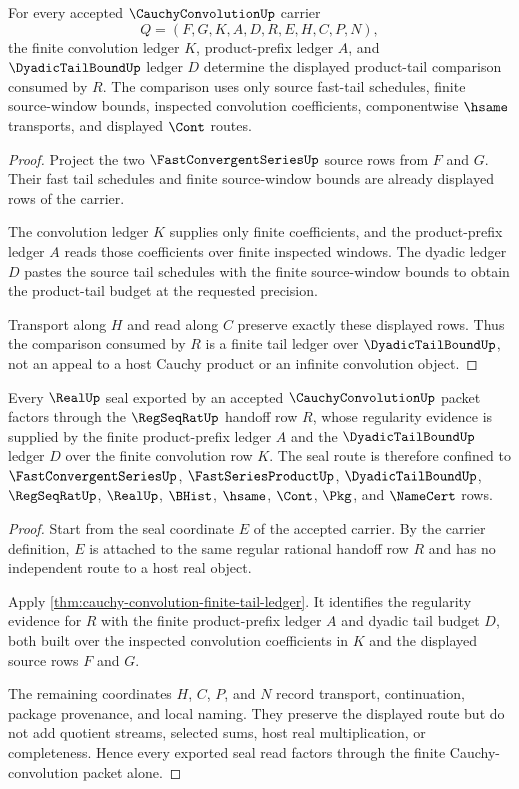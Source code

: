 \begin{theorem}
\label{thm:cauchy-convolution-finite-tail-ledger}
For every accepted $\CauchyConvolutionUp$ carrier
$$
Q=(F,G,K,A,D,R,E,H,C,P,N),
$$
the finite convolution ledger $K$, product-prefix ledger $A$, and $\DyadicTailBoundUp$ ledger $D$ determine the displayed product-tail comparison consumed by $R$. The comparison uses only source fast-tail schedules, finite source-window bounds, inspected convolution coefficients, componentwise $\hsame$ transports, and displayed $\Cont$ routes.
\end{theorem}
\begin{proof}
Project the two $\FastConvergentSeriesUp$ source rows from $F$ and $G$. Their fast tail schedules and finite source-window bounds are already displayed rows of the carrier.

The convolution ledger $K$ supplies only finite coefficients, and the product-prefix ledger $A$ reads those coefficients over finite inspected windows. The dyadic ledger $D$ pastes the source tail schedules with the finite source-window bounds to obtain the product-tail budget at the requested precision.

Transport along $H$ and read along $C$ preserve exactly these displayed rows. Thus the comparison consumed by $R$ is a finite tail ledger over $\DyadicTailBoundUp$, not an appeal to a host Cauchy product or an infinite convolution object.
\end{proof}

\begin{theorem}
\label{thm:cauchy-convolution-real-seal-handoff}
Every $\RealUp$ seal exported by an accepted $\CauchyConvolutionUp$ packet factors through the $\RegSeqRatUp$ handoff row $R$, whose regularity evidence is supplied by the finite product-prefix ledger $A$ and the $\DyadicTailBoundUp$ ledger $D$ over the finite convolution row $K$. The seal route is therefore confined to $\FastConvergentSeriesUp$, $\FastSeriesProductUp$, $\DyadicTailBoundUp$, $\RegSeqRatUp$, $\RealUp$, $\BHist$, $\hsame$, $\Cont$, $\Pkg$, and $\NameCert$ rows.
\end{theorem}
\begin{proof}
Start from the seal coordinate $E$ of the accepted carrier. By the carrier definition, $E$ is attached to the same regular rational handoff row $R$ and has no independent route to a host real object.

Apply \autoref{thm:cauchy-convolution-finite-tail-ledger}. It identifies the regularity evidence for $R$ with the finite product-prefix ledger $A$ and dyadic tail budget $D$, both built over the inspected convolution coefficients in $K$ and the displayed source rows $F$ and $G$.

The remaining coordinates $H$, $C$, $P$, and $N$ record transport, continuation, package provenance, and local naming. They preserve the displayed route but do not add quotient streams, selected sums, host real multiplication, or completeness. Hence every exported seal read factors through the finite Cauchy-convolution packet alone.
\end{proof}


